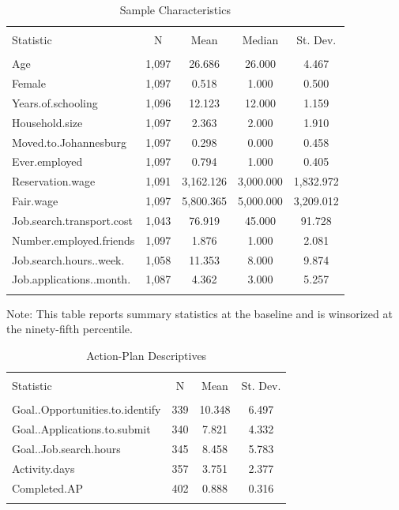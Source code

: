 \documentclass[]{elsarticle} %
\begin{document}
\begin{table}[H] \centering 
  \caption{Sample Characteristics} 
  \label{} 
\begin{tabular}{@{\extracolsep{5pt}}lcccc} 
\\[-1.8ex]\hline 
\hline \\[-1.8ex] 
Statistic & \multicolumn{1}{c}{N} & \multicolumn{1}{c}{Mean} & \multicolumn{1}{c}{Median} & \multicolumn{1}{c}{St. Dev.} \\ 
\hline \\[-1.8ex] 
Age & 1,097 & 26.686 & 26.000 & 4.467 \\ 
Female & 1,097 & 0.518 & 1.000 & 0.500 \\ 
Years.of.schooling & 1,096 & 12.123 & 12.000 & 1.159 \\ 
Household.size & 1,097 & 2.363 & 2.000 & 1.910 \\ 
Moved.to.Johannesburg & 1,097 & 0.298 & 0.000 & 0.458 \\ 
Ever.employed & 1,097 & 0.794 & 1.000 & 0.405 \\ 
Reservation.wage & 1,091 & 3,162.126 & 3,000.000 & 1,832.972 \\ 
Fair.wage & 1,097 & 5,800.365 & 5,000.000 & 3,209.012 \\ 
Job.search.transport.cost & 1,043 & 76.919 & 45.000 & 91.728 \\ 
Number.employed.friends & 1,097 & 1.876 & 1.000 & 2.081 \\ 
Job.search.hours..week. & 1,058 & 11.353 & 8.000 & 9.874 \\ 
Job.applications..month. & 1,087 & 4.362 & 3.000 & 5.257 \\ 
\hline \\[-1.8ex] 
\end{tabular} 
\end{table}

Note: This table reports summary statistics at the baseline and is
winsorized at the ninety-fifth percentile.

\begin{table}[H] \centering 
  \caption{Action-Plan Descriptives} 
  \label{} 
\begin{tabular}{@{\extracolsep{5pt}}lccc} 
\\[-1.8ex]\hline 
\hline \\[-1.8ex] 
Statistic & \multicolumn{1}{c}{N} & \multicolumn{1}{c}{Mean} & \multicolumn{1}{c}{St. Dev.} \\ 
\hline \\[-1.8ex] 
Goal..Opportunities.to.identify & 339 & 10.348 & 6.497 \\ 
Goal..Applications.to.submit & 340 & 7.821 & 4.332 \\ 
Goal..Job.search.hours & 345 & 8.458 & 5.783 \\ 
Activity.days & 357 & 3.751 & 2.377 \\ 
Completed.AP & 402 & 0.888 & 0.316 \\ 
\hline \\[-1.8ex] 
\end{tabular} 
\end{table}
\end{document}
